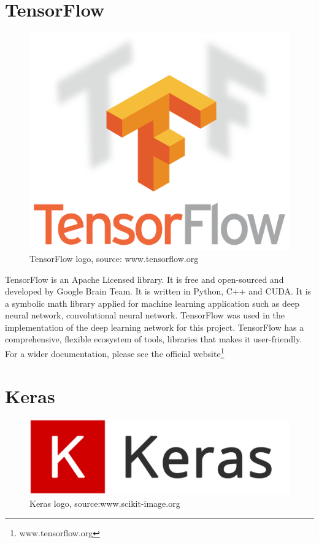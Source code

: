 \section{TensorFlow}
\begin{figure}[H]
    \centering
    \includegraphics[width=0.7\linewidth]{images/TensorFlow.png}
     \caption{TensorFlow logo, source: www.tensorflow.org}
  \end{figure}
TensorFlow is an Apache Licensed library. It is free and open-sourced and developed by Google Brain Team. It is written in Python, C++ and CUDA. It is a symbolic math library applied for machine learning application such as deep neural network, convolutional neural network. TensorFlow was used in the implementation of the deep learning network for this project. TensorFlow has a comprehensive, flexible ecosystem of tools, libraries that makes it user-friendly.
For a wider documentation, please see the official website\footnote{www.tensorflow.org}
\clearpage

\section{Keras}
\begin{figure}[H]
    \centering
    \includegraphics[width=0.9\linewidth]{images/keras.png}
     \caption{Keras logo, source:www.scikit-image.org}
  \end{figure}

